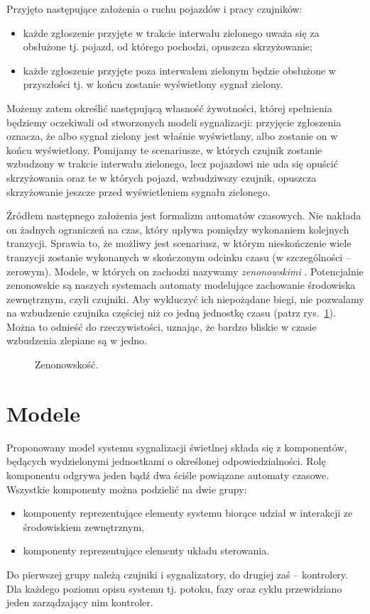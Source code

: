 \documentclass{pracamgr}
\newcommand{\imgr}[1]{rys.~\ref{#1}}
\theoremstyle{plain}
\begin{document}
Przyjęto następujące założenia o ruchu pojazdów i pracy czujników:
\begin{itemize}
  \item każde zgłoszenie przyjęte w trakcie interwału zielonego uważa
  się za obsłużone tj. pojazd, od którego pochodzi, opuszcza
  skrzyżowanie;
  \item każde zgłoszenie przyjęte poza interwałem zielonym będzie
  obsłużone w przyszłości tj. w końcu zostanie wyświetlony sygnał zielony.
\end{itemize}
Możemy zatem określić następującą własność żywotności, której
spełnienia będziemy oczekiwali od stworzonych modeli sygnalizacji:
przyjęcie zgłoszenia oznacza, że albo sygnał zielony jest właśnie
wyświetlany, albo zostanie on w końcu wyświetlony. Pomijamy te
scenariusze, w których czujnik zostanie wzbudzony w trakcie interwału
zielonego, lecz pojazdowi nie uda się opuścić skrzyżowania oraz te w
których pojazd, wzbudziwszy czujnik, opuszcza skrzyżowanie jeszcze
przed wyświetleniem sygnału zielonego.

Źródłem następnego założenia jest formalizm automatów czasowych. Nie
nakłada on żadnych ograniczeń na czas, który upływa pomiędzy
wykonaniem kolejnych tranzycji. Sprawia to, że możliwy jest
scenariusz, w którym nieskończenie wiele tranzycji zostanie wykonanych
w skończonym odcinku czasu (w szczególności -- zerowym). Modele, w
których on zachodzi nazywamy \emph{zenonowskimi} \cite{henz-94}.
Potencjalnie zenonowskie są naszych systemach automaty modelujące
zachowanie środowiska zewnętrznym, czyli czujniki. Aby wykluczyć ich
niepożądane biegi, nie pozwalamy na wzbudzenie czujnika częściej niż
co jedną jednostkę czasu (patrz \imgr{img:models-zeno}). Można to
odnieść do rzeczywistości, uznając, że bardzo bliskie w czasie
wzbudzenia zlepiane są w jedno.

\begin{figure}
  \centering
  \hspace{1in}
  \caption{Zenonowskość.}
  \label{img:models-zeno}
\end{figure}

\section{Modele}
\label{s:models:models}
Proponowany model systemu sygnalizacji świetlnej składa się z
komponentów, będących wydzielonymi jednostkami o określonej
odpowiedzialności. Rolę komponentu odgrywa jeden bądź dwa ściśle
powiązane automaty czasowe. Wszystkie komponenty można podzielić na
dwie grupy:
\begin{itemize}
  \item komponenty reprezentujące elementy systemu biorące udział w
  interakcji ze środowiskiem zewnętrznym,
  \item komponenty reprezentujące elementy układu sterowania.
\end{itemize}
Do pierwszej grupy należą czujniki i sygnalizatory, do drugiej zaś --
kontrolery. Dla każdego poziomu opisu systemu tj. potoku, fazy oraz
cyklu przewidziano jeden zarządzający nim kontroler.
\end{document}
